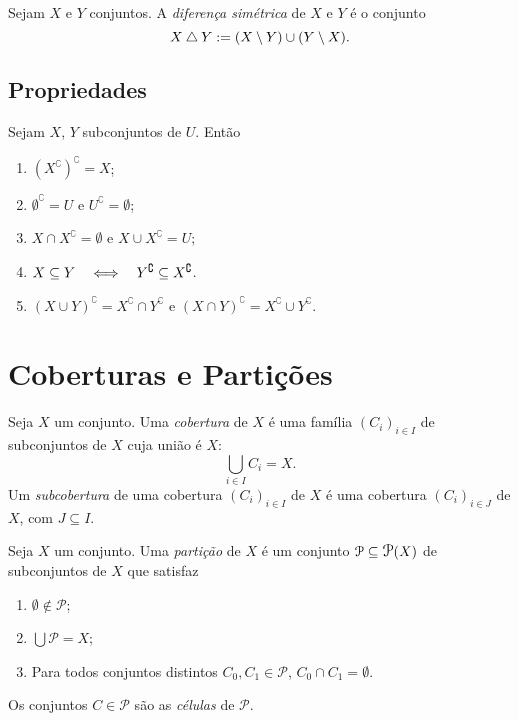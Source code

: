 \begin{defi}
Sejam $X$ e $Y$ conjuntos. A \emph{diferença simétrica} de $X$ e $Y$ é o conjunto
	\begin{equation*}
	X \mathbin{\triangle} Y := (X \setminus Y) \cup (Y \setminus X).
	\end{equation*}
\end{defi}

\subsection{Propriedades}

\begin{prop}
Sejam $X$, $Y$ subconjuntos de $U$. Então
	\begin{enumerate}
	\item $(X^\complement)^\complement = X$;
	\item $\emptyset^\complement = U$ e $U^\complement = \emptyset$;
	\item $X \cap X^\complement = \emptyset$ e $X \cup X^\complement = U$;
	\item $X \subseteq Y \quad \Longleftrightarrow \quad Y^\complement \subseteq X^\complement$.
	\item $(X \cup Y)^\complement = X^\complement \cap Y^\complement$ e $(X \cap Y)^\complement = X^\complement \cup Y^\complement$.
	\end{enumerate}
\end{prop}




\section{Coberturas e Partições}

\begin{defi}
Seja $X$ um conjunto. Uma \emph{cobertura} de $X$ é uma família $(C_i)_{i \in I}$ de subconjuntos de $X$ cuja união é $X$:
	\begin{equation*}
	\bigcup_{i \in I} C_i = X.
	\end{equation*}
Um \emph{subcobertura} de uma cobertura $(C_i)_{i \in I}$ de $X$ é uma cobertura $(C_i)_{i \in J}$ de $X$, com $J \subseteq I$.
\end{defi}

\begin{defi}
Seja $X$ um conjunto. Uma \emph{partição} de $X$ é um conjunto $\mathcal P \subseteq \p(X)$ de subconjuntos de $X$ que satisfaz
	\begin{enumerate}
	\item $\emptyset \notin \mathcal P$;
	\item $\displaystyle\bigcup \mathcal P = X$;
	\item Para todos conjuntos distintos $C_0,C_1 \in \mathcal P$, $C_0 \cap C_1 = \emptyset$.
	\end{enumerate}
Os conjuntos $C \in \mathcal P$ são as \emph{células} de $\mathcal P$.
\end{defi}

